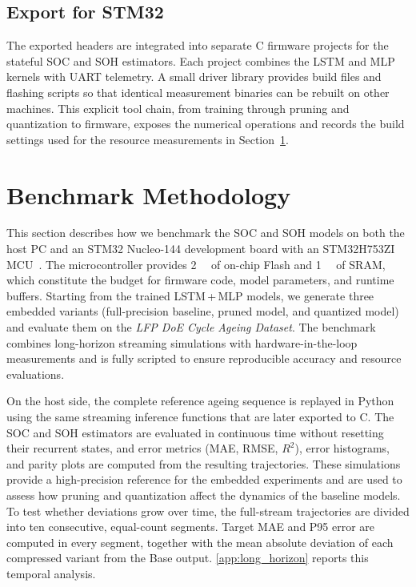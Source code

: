 \documentclass[review]{elsarticle}
\begin{document}
\subsection{Export for STM32}
The exported headers are integrated into separate C firmware projects for the stateful SOC and SOH estimators. Each project combines the LSTM and MLP kernels with UART telemetry. A small driver library provides build files and flashing scripts so that identical measurement binaries can be rebuilt on other machines. This explicit tool chain, from training through pruning and quantization to firmware, exposes the numerical operations and records the build settings used for the resource measurements in Section~\ref{sec:kpis}.
\section{Benchmark Methodology}\label{sec:kpis}
This section describes how we benchmark the SOC and SOH models on both the host PC and an STM32 Nucleo-144 development board with an STM32H753ZI MCU~\cite{STM32Nucleo144Boards2025_Datasheet,naguibMicroprocessorExecutionTime2022}. The microcontroller provides \SI{2}{\mega\byte} of on-chip Flash and \SI{1}{\mega\byte} of SRAM, which constitute the budget for firmware code, model parameters, and runtime buffers. Starting from the trained LSTM\,+\,MLP models, we generate three embedded variants (full-precision baseline, pruned model, and quantized model) and evaluate them on the \emph{LFP DoE Cycle Ageing Dataset}. The benchmark combines long-horizon streaming simulations with hardware-in-the-loop measurements and is fully scripted to ensure reproducible accuracy and resource evaluations.

On the host side, the complete reference ageing sequence is replayed in Python using the same streaming inference functions that are later exported to C. The SOC and SOH estimators are evaluated in continuous time without resetting their recurrent states, and error metrics (MAE, RMSE, $R^2$), error histograms, and parity plots are computed from the resulting trajectories. These simulations provide a high-precision reference for the embedded experiments and are used to assess how pruning and quantization affect the dynamics of the baseline models. To test whether deviations grow over time, the full-stream trajectories are divided into ten consecutive, equal-count segments. Target MAE and P95 error are computed in every segment, together with the mean absolute deviation of each compressed variant from the Base output. \ref{app:long_horizon} reports this temporal analysis.
\end{document}
